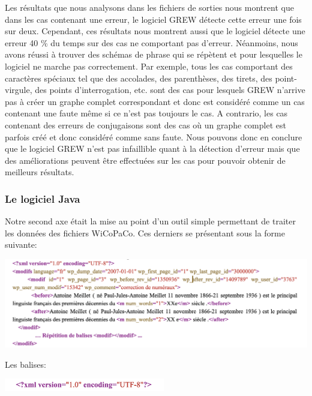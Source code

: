 \documentclass{article}
\begin{document}
Les r\'{e}sultats que nous analysons dans les fichiers de sorties nous montrent que dans les cas contenant une erreur, le logiciel GREW d\'{e}tecte cette erreur une fois sur deux. Cependant, ces r\'{e}sultats nous montrent aussi que le logiciel d\'{e}tecte une erreur 40 \% du temps sur des cas ne comportant pas d'erreur. N\'{e}anmoins, nous avons r\'{e}ussi \`{a} trouver des sch\'{e}mas de phrase qui se r\'{e}p\`{e}tent et pour lesquelles le logiciel ne marche pas correctement. Par exemple, tous les cas comportant des caract\`{e}res sp\'{e}ciaux tel que des accolades, des parenth\`{e}ses, des tirets, des point-virgule, des points d'interrogation, etc. sont des cas pour lesquels GREW n'arrive pas \`{a} cr\'{e}er un graphe complet correspondant et donc est consid\'{e}r\'{e} comme un cas contenant une faute m\^{e}me si ce n'est pas toujours le cas. A contrario, les cas contenant des erreurs de conjugaisons sont des cas o\`{u} un graphe complet est parfois cr\'{e}\'{e} et donc consid\'{e}r\'{e} comme sans faute. Nous pouvons donc en conclure que le logiciel GREW n'est pas infaillible quant \`{a} la d\'{e}tection d'erreur mais que des am\'{e}liorations peuvent \^{e}tre effectu\'{e}es sur les cas pour pouvoir obtenir de meilleurs r\'{e}sultats.


\subsubsection{Le logiciel Java}
Notre second axe \'{e}tait la mise au point d'un outil simple permettant de traiter les donn\'{e}es des fichiers WiCoPaCo. Ces derniers se pr\'{e}sentant sous la forme suivante:
\begin{center}
\includegraphics[width=14cm]{exemple4.png} %
\end{center}

Les balises:
\begin{center}
\includegraphics[width=7cm]{exemple5.png} %
\end{center}
\end{document}
